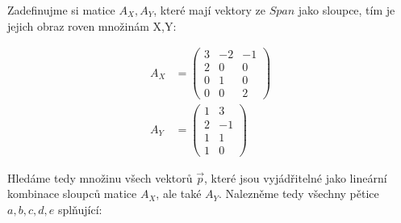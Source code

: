 \documentclass[12pt]{article}
\begin{document}
\begin{enumerate}
    Zadefinujme si matice $A_X,A_Y$, které mají vektory ze $Span$ jako sloupce, tím je jejich obraz roven množinám X,Y:

    \begin{align*}
      A_X &= \left(\begin{array}{ccc}
        3 & -2 & -1 \\
        2 & 0 & 0 \\
        0 & 1 & 0 \\
        0 & 0 & 2
      \end{array}\right) \\
      A_Y &= \left(\begin{array}{ccc}
        1 & 3 \\
        2 & -1 \\
        1 & 1 \\
        1 & 0
      \end{array}\right)
    \end{align*}

    Hledáme tedy množinu všech vektorů $\vec{p}$, které jsou vyjádřitelné jako lineární kombinace sloupců matice $A_X$, ale také $A_Y$.
    Nalezněme tedy všechny pětice $a,b,c,d,e$ splňující:


\end{enumerate}
\end{document}
